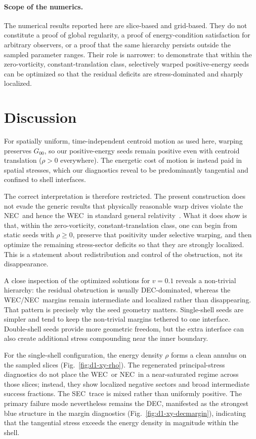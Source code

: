 \documentclass[11pt]{article}
\makeatletter
\newcommand{\@abbr}[1]{\ifmmode\mathrm{#1}\else\textsc{#1}\fi}
\newcommand{\WEC}{\@abbr{WEC}}
\newcommand{\NEC}{\@abbr{NEC}}
\newcommand{\SEC}{\@abbr{SEC}}
\newcommand{\DEC}{\@abbr{DEC}}
\makeatother
\begin{document}
\paragraph{Scope of the numerics.}
The numerical results reported here are slice-based and grid-based. They do not constitute a proof of global regularity, a proof of energy-condition satisfaction for arbitrary observers, or a proof that the same hierarchy persists outside the sampled parameter ranges. Their role is narrower: to demonstrate that within the zero-vorticity, constant-translation class, selectively warped positive-energy seeds can be optimized so that the residual deficits are stress-dominated and sharply localized.

\section{Discussion}
\label{sec:implications}
For spatially uniform, time-independent centroid motion as used here, warping preserves $G_{00}$, so our positive-energy seeds remain positive even with centroid translation ($\rho > 0$ everywhere). The energetic cost of motion is instead paid in spatial stresses, which our diagnostics reveal to be predominantly tangential and confined to shell interfaces.

The correct interpretation is therefore restricted. The present construction does not evade the generic results that physically reasonable warp drives violate the \NEC\ and hence the \WEC\ in standard general relativity~\cite{Olum:1998mu,Santiago:2021aup}. What it does show is that, within the zero-vorticity, constant-translation class, one can begin from static seeds with $\rho\ge 0$, preserve that positivity under selective warping, and then optimize the remaining stress-sector deficits so that they are strongly localized. This is a statement about redistribution and control of the obstruction, not its disappearance.

A close inspection of the optimized solutions for $v=0.1$ reveals a non-trivial hierarchy: the residual obstruction is usually \DEC-dominated, whereas the \WEC/\NEC\ margins remain intermediate and localized rather than disappearing. That pattern is precisely why the seed geometry matters. Single-shell seeds are simpler and tend to keep the non-trivial margins tethered to one interface. Double-shell seeds provide more geometric freedom, but the extra interface can also create additional stress compounding near the inner boundary.

For the single-shell configuration, the energy density $\rho$ forms a clean annulus on the sampled slices (Fig.~\ref{fig:d1-xy-rho}). The regenerated principal-stress diagnostics do not place the \WEC\ or \NEC\ in a near-saturated regime across those slices; instead, they show localized negative sectors and broad intermediate success fractions. The \SEC\ trace is mixed rather than uniformly positive. The primary failure mode nevertheless remains the \DEC, manifested as the strongest blue structure in the margin diagnostics (Fig.~\ref{fig:d1-xy-decmargin}), indicating that the tangential stress exceeds the energy density in magnitude within the shell.
\end{document}
